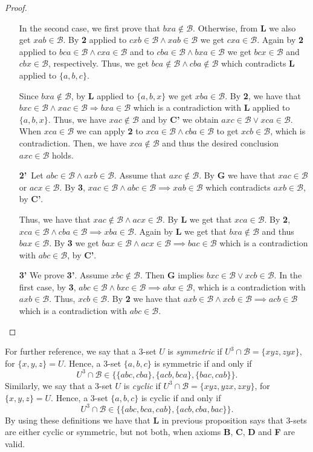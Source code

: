 \documentclass{article}
\newcommand{\calb}{\mathcal{B}}
\begin{document}
\begin{proof}
\begin{enumerate}
		In the second case, we first prove that $ bxa\notin\calb$. Otherwise, from \textbf{L}  we  also get $xab\in\calb$. By \textbf{2} applied to $cxb\in\calb\land xab\in\calb$ we get $cxa\in\calb$. Again by \textbf{2} applied to $bca\in\calb\land cxa\in\calb$ and to $cba\in\calb\land bxa\in\calb$ we get $bcx\in\calb$ and $cbx\in\calb$, respectively. Thus, we get  $bca\notin\calb\land cba\notin\calb$ which contradicts \textbf{L} applied to $\{a,b,c\}$.
	
		Since $bxa\notin\calb$, by \textbf{L} applied to $\{a,b,x\}$ we get $xba\in\calb$.   By \textbf{2}, we have that $bxc\in\calb\land xac\in\calb\Rightarrow bxa\in\calb$ which is a contradiction with  \textbf{L} applied to $\{a,b,x\}$. Thus, we have $xac\notin\calb$ and by \textbf{C'} we obtain $axc\in\calb\lor xca\in\calb$. When $xca\in\calb$ we can apply \textbf{2} to $xca\in\calb\land cba\in\calb$ to get $xcb\in  \calb$, which is contradiction. Then, we have $xca\notin  \calb$ and thus the desired conclusion $axc\in  \calb$ holds.
	
		\item[\textbf{2'}\,] Let $abc\in  \calb\land axb\in  \calb$. Assume that $axc \notin  \calb$.   By \textbf{G} we have that $xac\in  \calb$ or $acx\in  \calb$.   By \textbf{3}, $xac\in  \calb\land abc\in  \calb\implies xab\in  \calb$ which contradicts $axb\in  \calb$, by \textbf{C'}.
	
		Thus, we have that $xac\notin\calb\land acx\in  \calb$.   By \textbf{L} we get that $xca\in  \calb$.   By \textbf{2},  $xca\in  \calb\land cba\in\calb\implies xba\in  \calb$. Again by \textbf{L} we get that $bxa\notin  \calb$ and thus $bax\in  \calb$.   By \textbf{3} we get $bax\in  \calb\land acx\in  \calb\implies bac\in  \calb$ which is a contradiction with $abc\in  \calb$, by \textbf{C'}.
	
		\item[\textbf{3'}]  We prove \textbf{3'}. Assume $ xbc \notin  \calb$. Then \textbf{G} implies $bxc\in  \calb\lor xcb\in  \calb$. In the first case, by \textbf{3}, $abc\in  \calb\land bxc\in  \calb\implies abx\in  \calb$, which is a contradiction with $axb\in  \calb$. Thus, $xcb\in  \calb$.   By \textbf{2} we have that $axb\in  \calb\land xcb\in  \calb\implies acb\in  \calb$ which is a contradiction with $abc\in  \calb$.
        
        
	\end{enumerate}
 \end{proof}

For further reference, we say that a 3-set $U$ is \emph{symmetric} if $U^3\cap \calb=\{xyz,zyx\}$, for $\{x,y,z\}=U$. Hence, a 3-set $\{a,b,c\}$ is symmetric if and only if $$U^3\cap \calb \in \{ \{abc,cba\},\{acb,bca\}, \{bac,cab\}\}.$$ Similarly, we say that a 3-set $U$ is \emph{cyclic} if $U^3\cap \calb=\{xyz,yzx,zxy\}$, for $\{x,y,z\}=U$. Hence, a 3-set $\{a,b,c\}$ is cyclic if and only if $$U^3\cap \calb \in \{ \{abc,bca,cab\},\{acb,cba,bac\}\}.$$ By using these definitions we have that \textbf{L} in previous proposition says that 3-sets are either cyclic or symmetric, but not both, when axioms \textbf{B}, \textbf{C}, \textbf{D} and \textbf{F} are valid.
\end{document}
